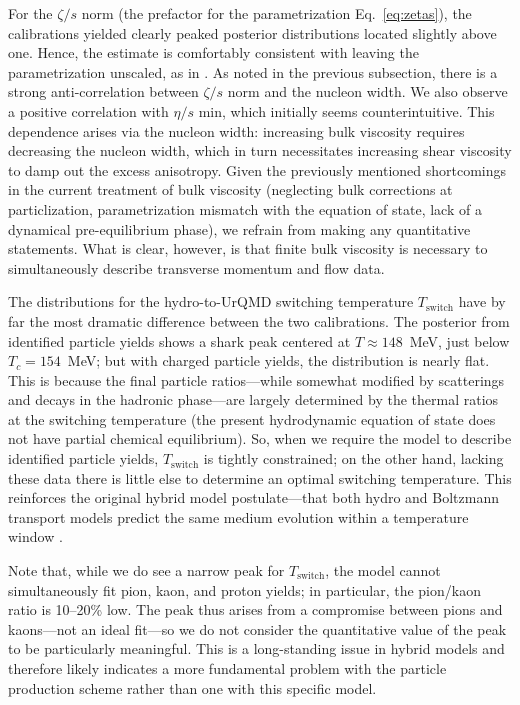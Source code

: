 \documentclass[aps,prc,reprint,amsmath,nofootinbib,superscriptaddress]{revtex4-1}
\begin{document}
For the $\zeta/s$ norm (the prefactor for the parametrization Eq.~\eqref{eq:zetas}), the calibrations yielded clearly peaked posterior distributions located slightly above one.
Hence, the estimate is comfortably consistent with leaving the parametrization unscaled, as in \cite{Ryu:2015vwa}.
As noted in the previous subsection, there is a strong anti-correlation between $\zeta/s$ norm and the nucleon width.
We also observe a positive correlation with $\eta/s$ min, which initially seems counterintuitive.
This dependence arises via the nucleon width:
increasing bulk viscosity requires decreasing the nucleon width, which in turn necessitates increasing shear viscosity to damp out the excess anisotropy.
Given the previously mentioned shortcomings in the current treatment of bulk viscosity (neglecting bulk corrections at particlization, parametrization mismatch with the equation of state, lack of a dynamical pre-equilibrium phase), we refrain from making any quantitative statements.
What is clear, however, is that finite bulk viscosity is necessary to simultaneously describe transverse momentum and flow data.

The distributions for the hydro-to-UrQMD switching temperature $T_\text{switch}$ have by far the most dramatic difference between the two calibrations.
The posterior from identified particle yields shows a shark peak centered at $T \approx 148$~MeV, just below $T_c = 154$~MeV;
but with charged particle yields, the distribution is nearly flat.
This is because the final particle ratios---while somewhat modified by scatterings and decays in the hadronic phase---are largely determined by the thermal ratios at the switching temperature (the present hydrodynamic equation of state does not have partial chemical equilibrium).
So, when we require the model to describe identified particle yields, $T_\text{switch}$ is tightly constrained;
on the other hand, lacking these data there is little else to determine an optimal switching temperature.
This reinforces the original hybrid model postulate---that both hydro and Boltzmann transport models predict the same medium evolution within a temperature window \cite{Bass:2000ib,Nonaka:2006yn,Petersen:2008dd}.

Note that, while we do see a narrow peak for $T_\text{switch}$, the model cannot simultaneously fit pion, kaon, and proton yields;
in particular, the pion/kaon ratio is 10--20\% low.
The peak thus arises from a compromise between pions and kaons---not an ideal fit---so we do not consider the quantitative value of the peak to be particularly meaningful.
This is a long-standing issue in hybrid models \cite{Song:2013qma} and therefore likely indicates a more fundamental problem with the particle production scheme rather than one with this specific model.
\end{document}
